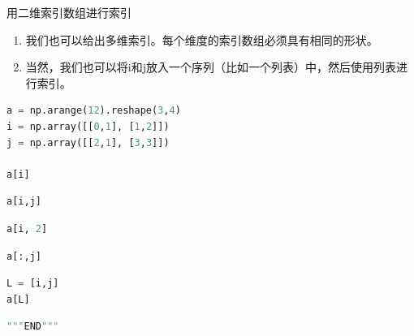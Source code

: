 \documentclass[ignorenonframetext,11pt,xcolor=dvipsnames,hyperref={colorlinks,allcolors=.,urlcolor=blue, citecolor=violet, bookmarksdepth=4},aspectratio=1610]{beamer}
\providecommand{\tightlist}{%
  \setlength{\itemsep}{0pt}\setlength{\parskip}{0pt}}
\begin{document}
\begin{frame}[fragile]{用二维索引数组进行索引}
\protect\hypertarget{section-21}{}

\begin{enumerate}
\tightlist
\item
  我们也可以给出多维索引。每个维度的索引数组必须具有相同的形状。
\item
  当然，我们也可以将i和j放入一个序列（比如一个列表）中，然后使用列表进行索引。
\end{enumerate}

\begin{lstlisting}[language=Python]
a = np.arange(12).reshape(3,4)
i = np.array([[0,1], [1,2]])
j = np.array([[2,1], [3,3]])

a[i]
\end{lstlisting}

\begin{lstlisting}[language=Python]
a[i,j]
\end{lstlisting}

\begin{lstlisting}[language=Python]
a[i, 2]
\end{lstlisting}

\begin{lstlisting}[language=Python]
a[:,j]
\end{lstlisting}

\begin{lstlisting}[language=Python]
L = [i,j]
a[L]
\end{lstlisting}

\begin{lstlisting}[language=Python]
"""END"""
\end{lstlisting}

\end{frame}
\end{document}
